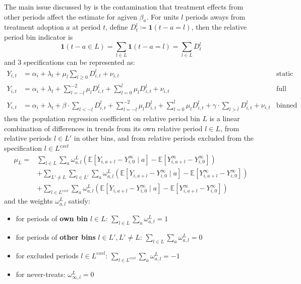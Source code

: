 \documentclass[twoside]{article}
\begin{document}
The main issue discussed by \citet{sun2021estimating} is the contamination that treatment effects from other periods affect the estimate for agiven $\beta_a$. 
For units $l$ periods aways from treatment adoption $a$ at period $t$, define $D^l_t \coloneq \mathbf{1}\left(t-a=l\right)$, then the relative period bin indicator is $$ \mathbf{1}(t-a\in L) = \sum_{l\in L}\mathbf{1}(t-a=l) = \sum_{l\in L}D^l_{t} $$
and 3 specifications can be represented as:
\begin{align*}
    Y_{i,t} &= \alpha_i + \lambda_t + \mu_l \sum_{l\geq 0} D^l_{i,t} + \nu_{i,t} & \text{static} \\
    Y_{i,t} &= \alpha_i + \lambda_t + \sum^{-2}_{l=-\underline{l}} \mu_l D^l_{i,t} + \sum^{\bar{l}}_{l=0}\mu_l D^l_{i,t} + \nu_{i,t} & \text{full dynamic} \\
    Y_{i,t} &= \alpha_i + \lambda_t + \beta\cdot \sum_{l< -\underline{l}} D^l_{i,t} + \sum^{-2}_{l=-\underline{l}} \mu_l D^l_{i,t} + \sum^{\bar{l}}_{l=0}\mu_l D^l_{i,t} + \gamma \cdot \sum_{l>\bar{l}} D^l_{i,t} + \nu_{i,t} & \text{binned dynamic}
\end{align*}
then the population regression coefficient on relative period bin $L$ is a linear combination of differences in trends from its own relative period $l\in L$, from relative periods $l\in L'$ in other bins, and from relative periods excluded from the specification $l\in L^{excl}$
\begin{align*}
    \mu_L = & \sum_{l\in L}\sum_a \omega^{L}_{a,l}\left( \mathbb{E}\left[Y_{i,a+l}-Y^{\infty}_{i,0}\mid a \right] - \mathbb{E} \left[Y^{\infty}_{i,a+l}-Y^{\infty}_{i,0}\right] \right) \\
    &+ \sum_{L'\neq L} \sum_{l\in L'}\sum_a \omega^{L}_{a,l} \left( \mathbb{E}\left[Y_{i,a+l}-Y^{\infty}_{i,0}\mid a\right] - \mathbb{E}\left[Y^{\infty}_{i,a+l}-Y^{\infty}_{i,0}\right] \right) \\
    &+ \sum_{l\in L^{excl}} \sum_a \omega^{L}_{a,l} \left(\mathbb{E}\left[Y_{i,a+l}-Y^{\infty}_{i,0}\mid a \right] - \mathbb{E}\left[Y^{\infty}_{i,a+l}-Y^{\infty}_{i,0}\right] \right)
\end{align*}
and the weights $\omega_{a,l}^L$ satisfy:
\begin{itemize}
    \item for periods of \textbf{own bin} $l\in L$: $\sum_{l\in L}\sum_a \omega^L_{a,l}=1$
    \item for periods of \textbf{other bins} $l\in L',L'\neq L$: $\sum_{l\in L }\sum_a \omega ^L_{a,l}=0$
    \item for excluded periods $l\in L^{excl}$: $\sum_{l\in L^{excl}} \sum_a \omega^L_{a,l}=-1$
    \item for never-treats: $\omega^L_{\infty,l}=0$
\end{itemize}
\end{document}
